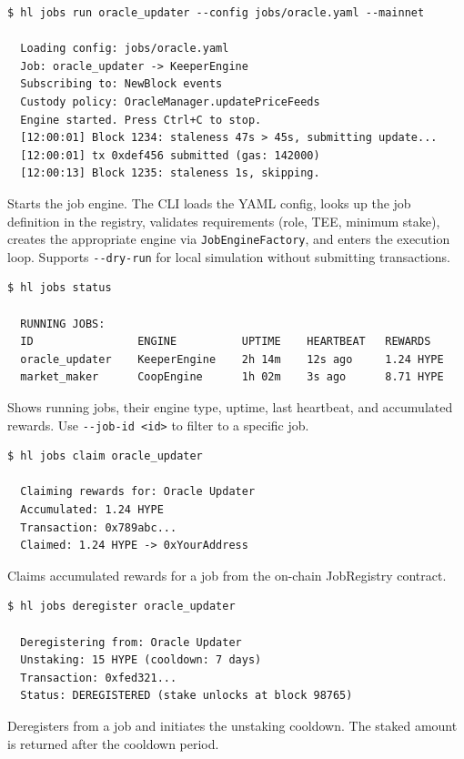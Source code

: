 \documentclass[11pt,a4paper]{article}
\begin{document}
\begin{clibox}
\begin{lstlisting}
$ hl jobs run oracle_updater --config jobs/oracle.yaml --mainnet

  Loading config: jobs/oracle.yaml
  Job: oracle_updater -> KeeperEngine
  Subscribing to: NewBlock events
  Custody policy: OracleManager.updatePriceFeeds
  Engine started. Press Ctrl+C to stop.
  [12:00:01] Block 1234: staleness 47s > 45s, submitting update...
  [12:00:01] tx 0xdef456 submitted (gas: 142000)
  [12:00:13] Block 1235: staleness 1s, skipping.
\end{lstlisting}
Starts the job engine. The CLI loads the YAML config, looks up the job definition
in the registry, validates requirements (role, TEE, minimum stake), creates the
appropriate engine via \texttt{JobEngineFactory}, and enters the execution loop.
Supports \texttt{-{}-dry-run} for local simulation without submitting transactions.
\end{clibox}

\begin{clibox}
\begin{lstlisting}
$ hl jobs status

  RUNNING JOBS:
  ID                ENGINE          UPTIME    HEARTBEAT   REWARDS
  oracle_updater    KeeperEngine    2h 14m    12s ago     1.24 HYPE
  market_maker      CoopEngine      1h 02m    3s ago      8.71 HYPE
\end{lstlisting}
Shows running jobs, their engine type, uptime, last heartbeat, and accumulated rewards.
Use \texttt{-{}-job-id <id>} to filter to a specific job.
\end{clibox}

\begin{clibox}
\begin{lstlisting}
$ hl jobs claim oracle_updater

  Claiming rewards for: Oracle Updater
  Accumulated: 1.24 HYPE
  Transaction: 0x789abc...
  Claimed: 1.24 HYPE -> 0xYourAddress
\end{lstlisting}
Claims accumulated rewards for a job from the on-chain JobRegistry contract.
\end{clibox}

\begin{clibox}
\begin{lstlisting}
$ hl jobs deregister oracle_updater

  Deregistering from: Oracle Updater
  Unstaking: 15 HYPE (cooldown: 7 days)
  Transaction: 0xfed321...
  Status: DEREGISTERED (stake unlocks at block 98765)
\end{lstlisting}
Deregisters from a job and initiates the unstaking cooldown. The staked amount
is returned after the cooldown period.
\end{clibox}
\end{document}
